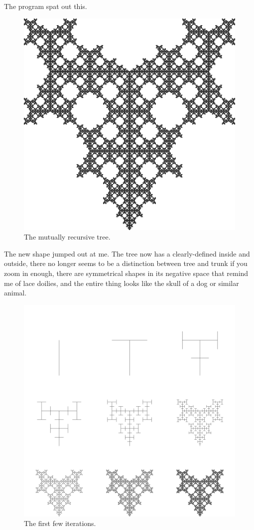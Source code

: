 \documentclass{article}
\begin{document}
The program spat out this.
\begin{figure}[H]
  \centering
  \includegraphics[scale=0.125]{tree.png}
  \caption*{The mutually recursive tree.}
\end{figure}
The new shape jumped out at me.
The tree now has a clearly-defined inside and outside,
there no longer seems to be a distinction between tree and trunk if you zoom in enough,
there are symmetrical shapes in its negative space that remind me of lace doilies,
and the entire thing looks like the skull of a dog or similar animal.
\begin{figure}[H]
  \centering
  \includegraphics[scale=0.125]{tree_composite.png}
  \caption*{The first few iterations.}
\end{figure}
\end{document}
